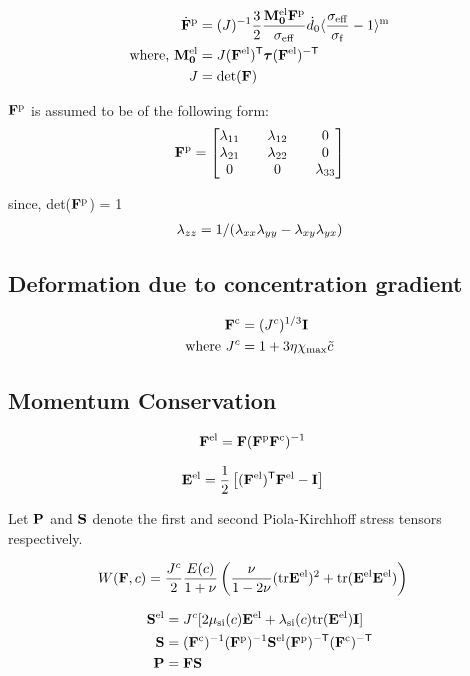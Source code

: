\documentclass[../main.tex]{subfiles}
\begin{document}
\begin{align}
\dot{\F}^\p &= \inv{J} \fc{3}{2} \fc{\Mel \F^\p}{\sigmaeff} \dZEROdot \langle \fc{\sigmaeff}{\sigmaf} - 1 \rangle^\m  \\
\text{where, }\Mel &= J (\F^\el)^\T \DCS (\F^\el)^\mT \\
J &= \mathrm{det}(\F) 
\end{align}

$\F^{\rm{p}}$ is assumed to be of the following form:
\begin{align}
    \F^\p = \tensor{\lambda}
\end{align}

since, det($\F^\p$) = 1
\begin{gather}
     \lamzz = 1/(\lamxx \lamyy - \lamxy \lamyx)
\end{gather}



\subsection{Deformation due to concentration gradient}
\begin{align}
    \F^\c &= (\jc)^{1/3} \I \\
    \text{where } \jc &= 1 + 3 \eta \xmax \tc
\end{align}


\subsection{Momentum Conservation}

\begin{align}
    \F^\el &=  \F \inv{\F^\p \F^\c}
\end{align}






\begin{align}
\E^{\el} &= \fc{1}{2} \left[ (\F^\el)^\T \F^\el - \I \right]
\end{align}





Let $\PK$ and $\PKS$ denote the first and second Piola-Kirchhoff stress tensors respectively.

\begin{align}
    W(\F, c) &= \fc{\jc}{2}\fc{E(c)}{1 + \nu}\left( \fc{\nu}{1-2\nu}(\text{tr}\E^\el)^2 + \tr{\E^\el \E^\el}\right)
\end{align}

\begin{align}
    \PKS^\el &= \jc[2 \muSic \E^\el + \lamSic \tr{\E^\el}\I ]\\
    \PKS &= \inv{\F^\c} \inv{\F^\p} \PKS^\el \invT{\F^\p} \invT{\F^\c} \\
    \PK &= \F \PKS 
\end{align}
\end{document}

